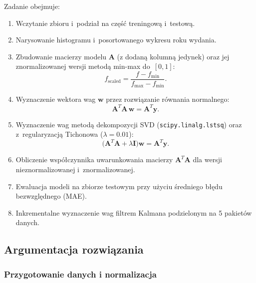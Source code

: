 \documentclass[12pt, a4paper]{article}
\begin{document}
Zadanie obejmuje:
\begin{enumerate}
  \item[(a)] Wczytanie zbioru i~podział na część treningową i~testową.
  \item[(b)] Narysowanie histogramu i~posortowanego wykresu roku wydania.
  \item[(c)--(d)] Zbudowanie macierzy modelu $\mathbf{A}$ (z dodaną kolumną jedynek)
        oraz jej znormalizowanej wersji metodą min-max do~$[0,1]$:
        \begin{equation}
          f_{\text{scaled}} = \frac{f - f_{\min}}{f_{\max} - f_{\min}}.
          \label{eq:minmax}
        \end{equation}
  \item[(e)] Wyznaczenie wektora wag $\mathbf{w}$ przez rozwiązanie równania normalnego:
        \begin{equation}
          \mathbf{A}^T \mathbf{A}\, \mathbf{w} = \mathbf{A}^T \mathbf{y}.
          \label{eq:normal}
        \end{equation}
  \item[(f)] Wyznaczenie wag metodą dekompozycji SVD (\texttt{scipy.linalg.lstsq})
        oraz z~regularyzacją Tichonowa ($\lambda = 0.01$):
        \begin{equation}
          \bigl(\mathbf{A}^T \mathbf{A} + \lambda\mathbf{I}\bigr)\mathbf{w}
          = \mathbf{A}^T \mathbf{y}.
          \label{eq:tikhonov}
        \end{equation}
  \item[(g)] Obliczenie współczynnika uwarunkowania macierzy $\mathbf{A}^T\mathbf{A}$
        dla wersji nieznormalizowanej i~znormalizowanej.
  \item[(h)] Ewaluacja modeli na zbiorze testowym przy użyciu średniego błędu
        bezwzględnego (MAE).
  \item[(i)] Inkrementalne wyznaczenie wag filtrem Kalmana podzielonym na
        5 pakietów danych.
\end{enumerate}

\subsection{Argumentacja rozwiązania}

\subsubsection{Przygotowanie danych i normalizacja}
\end{document}
